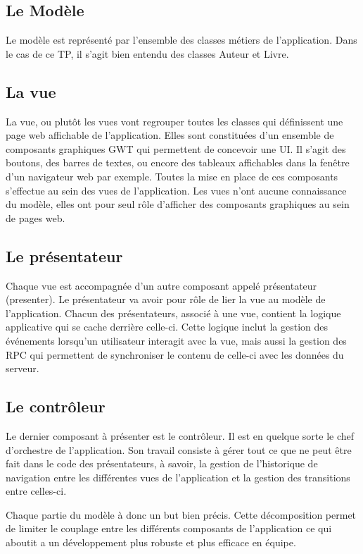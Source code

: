 \subsection{Le Modèle}
Le modèle est représenté par l'ensemble des classes métiers de l'application. Dans le cas de ce TP, il s'agit bien entendu des classes Auteur et Livre.

\subsection{La vue}
La vue, ou plutôt les vues vont regrouper toutes les classes qui définissent une page web affichable de l'application. Elles sont constituées d'un ensemble de composants graphiques GWT qui permettent de concevoir une UI. Il s'agit des boutons, des barres de textes, ou encore des tableaux affichables dans la fenêtre d'un navigateur web par exemple. Toutes la mise en place de ces composants s'effectue au sein des vues de l'application. Les vues n'ont aucune connaissance du modèle, elles ont pour seul rôle d'afficher des composants graphiques au sein de pages web.

\subsection{Le présentateur}
Chaque vue est accompagnée d'un autre composant appelé présentateur (presenter). Le présentateur va avoir pour rôle de lier la vue au modèle de l'application. Chacun des présentateurs, associé à une vue, contient la logique applicative qui se cache derrière celle-ci. Cette logique inclut la gestion des événements lorsqu'un utilisateur interagit avec la vue, mais aussi la gestion des RPC qui permettent de synchroniser le contenu de celle-ci avec les données du serveur.

\subsection{Le contrôleur}
Le dernier composant à présenter est le contrôleur. Il est en quelque sorte le chef d'orchestre de l'application. Son travail consiste à gérer tout ce que ne peut être fait dans le code des présentateurs, à savoir, la gestion de l'historique de navigation entre les différentes vues de l'application et la gestion des transitions entre celles-ci.

Chaque partie du modèle à donc un but bien précis. Cette décomposition permet de limiter le couplage entre les différents composants de l'application ce qui aboutit a un développement plus robuste et plus efficace en équipe.

